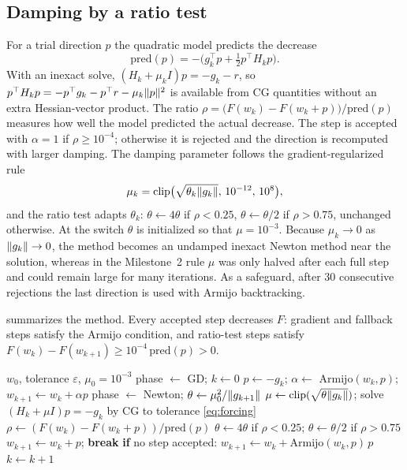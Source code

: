 \subsection{Damping by a ratio test}
For a trial direction $p$ the quadratic model predicts the decrease
\begin{equation}\label{eq:pred}
  \mathrm{pred}(p)=-\bigl(g_k^\top p+\tfrac12 p^\top H_kp\bigr).
\end{equation}
With an inexact solve, $(H_k+\mu_kI)p=-g_k-r$, so
$p^\top H_kp=-p^\top g_k-p^\top r-\mu_k\lVert p\rVert^2$ is available from CG quantities
without an extra Hessian-vector product. The ratio
$\rho=\bigl(F(w_k)-F(w_k+p)\bigr)/\mathrm{pred}(p)$ measures how well the model
predicted the actual decrease. The step is accepted with $\alpha=1$ if
$\rho\ge10^{-4}$; otherwise it is rejected and the direction is recomputed with
larger damping. The damping parameter follows the gradient-regularized rule
\begin{equation}\label{eq:mu}
  \mu_k=\operatorname{clip}\bigl(\sqrt{\theta_k\lVert g_k\rVert},\,10^{-12},\,10^{8}\bigr),
\end{equation}
and the ratio test adapts $\theta_k$: $\theta\leftarrow4\theta$ if $\rho<0.25$,
$\theta\leftarrow\theta/2$ if $\rho>0.75$, unchanged otherwise. At the switch
$\theta$ is initialized so that $\mu=10^{-3}$. Because $\mu_k\to0$ as
$\lVert g_k\rVert\to0$, the method becomes an undamped inexact Newton method near the
solution, whereas in the Milestone~2 rule $\mu$ was only halved after each full
step and could remain large for many iterations. As a safeguard, after 30 consecutive
rejections the last direction is used with Armijo backtracking.

 summarizes the method. Every accepted step decreases $F$: gradient
and fallback steps satisfy the Armijo condition, and ratio-test steps satisfy
$F(w_k)-F(w_{k+1})\ge10^{-4}\,\mathrm{pred}(p)>0$.

\begin{algorithm}[t]
\caption{ASH-LR}\label{alg:ash}
\begin{algorithmic}[1]
\Require $w_0$, tolerance $\varepsilon$, $\mu_0=10^{-3}$
\State phase $\gets$ GD; $k\gets0$
    \State $p\gets-g_k$; $\alpha\gets$ Armijo$(w_k,p)$; $w_{k+1}\gets w_k+\alpha p$
      \State phase $\gets$ Newton; $\theta\gets\mu_0^2/\lVert g_{k+1}\rVert$
    \EndIf
  \Else
      \State $\mu\gets\operatorname{clip}(\sqrt{\theta\lVert g_k\rVert})$; solve $(H_k+\mu I)p=-g_k$ by CG to tolerance \eqref{eq:forcing}
      \State $\rho\gets(F(w_k)-F(w_k+p))/\mathrm{pred}(p)$
      \State $\theta\gets4\theta$ if $\rho<0.25$; \quad $\theta\gets\theta/2$ if $\rho>0.75$
       \State $w_{k+1}\gets w_k+p$; \textbf{break} \EndIf
    \EndFor
    \State \textbf{if} no step accepted: $w_{k+1}\gets w_k+\text{Armijo}(w_k,p)\,p$
  \EndIf
  \State $k\gets k+1$
\EndWhile
\end{algorithmic}
\end{algorithm}

